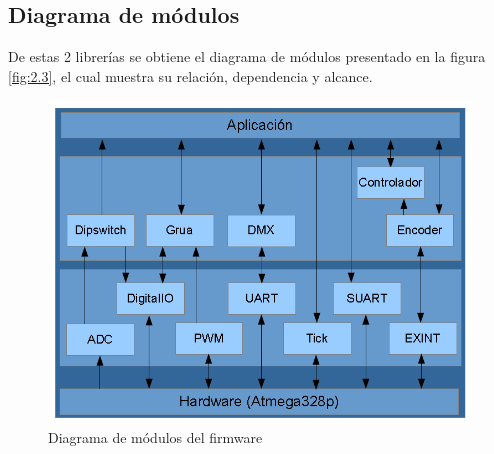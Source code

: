 \newpage
\subsection{Diagrama de módulos}
De estas 2 librerías se obtiene el diagrama de módulos presentado en la figura \ref{fig:2.3}, el cual muestra su relación, dependencia y alcance. 

\begin{figure}[!ht]
	\centering
	\includegraphics[width=14cm,scale=1]{resources/2_3-diagramaDeModulos.png}
	\caption{Diagrama de módulos del firmware}
	\label{fig:\thefigure}
\end{figure}
